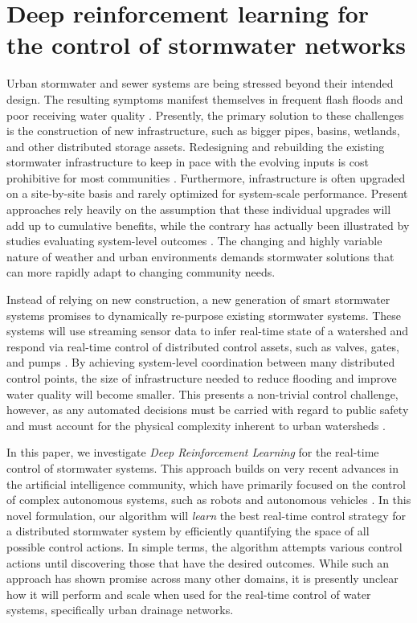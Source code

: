 \chapter{Deep reinforcement learning for
the control of stormwater
networks}\label{ch:rl}
\vspace{1cm}

Urban stormwater and sewer systems are being stressed beyond their intended design.
The resulting symptoms manifest themselves in frequent flash floods \cite{LarisKarklisBefore-and-afterPost} and poor receiving water quality \cite{Watson2016TheHypoxia}.
Presently, the primary solution to these challenges is the construction of new infrastructure, such as bigger pipes, basins, wetlands, and other distributed storage assets.
Redesigning and rebuilding the existing stormwater infrastructure to keep in pace with the evolving inputs is cost prohibitive for most communities \cite{Kerkez2016}.
Furthermore, infrastructure is often upgraded on a site-by-site basis and rarely optimized for system-scale performance.
Present approaches rely heavily on the assumption that these individual upgrades will add up to cumulative benefits, while the contrary has actually been illustrated by studies evaluating system-level outcomes \cite{Emerson2005Watershed-ScaleBasins}.
The changing and highly variable nature of weather and urban environments demands stormwater solutions that can more rapidly adapt to changing community needs.


Instead of relying on new construction, a new generation of smart stormwater systems promises to dynamically re-purpose existing stormwater systems.
These systems will use streaming sensor data to infer real-time state of a watershed and respond via real-time control of distributed control assets, such as valves, gates, and pumps \cite{Kerkez2016}.
By achieving system-level coordination between many distributed control points, the size of infrastructure needed to reduce flooding and improve water quality will become smaller.
This presents a non-trivial control challenge, however, as any automated decisions must be carried with regard to public safety and must account for the physical complexity inherent to urban watersheds \cite{Mullapudi2017, Schutze2004RealToday}.

In this paper, we investigate \textit{Deep Reinforcement Learning} for the real-time control of stormwater systems.
This approach builds on very recent advances in the artificial intelligence community, which have primarily focused on the control of complex autonomous systems, such as robots and autonomous vehicles \cite{Mnih2015,Lillicrap2015ContinuousLearning}.
In this novel formulation, our algorithm will \textit{learn} the best real-time control strategy for a distributed stormwater system by efficiently quantifying the space of all possible control actions.
In simple terms, the algorithm attempts various control actions until discovering those that have the desired outcomes.
While such an approach has shown promise across many other domains, it is presently unclear how it will perform and scale when used for the real-time control of water systems, specifically urban drainage networks.


